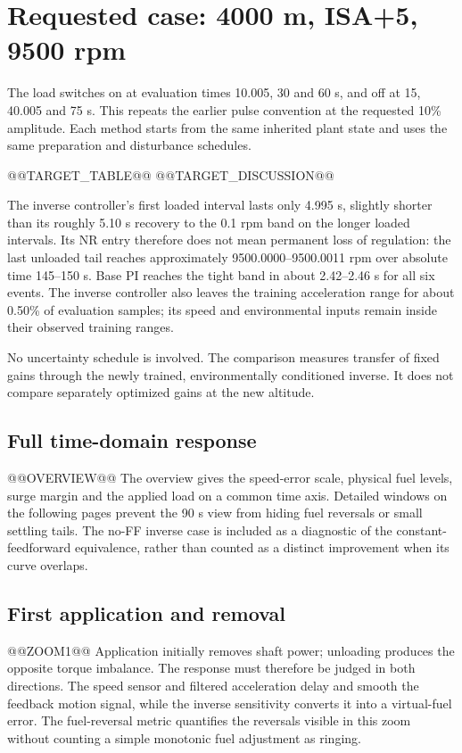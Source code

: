 \clearpage
\section{Requested case: 4000 m, ISA+5, 9500 rpm}
The load switches on at evaluation times 10.005, 30 and 60 s, and off at 15, 40.005 and 75 s. This repeats the earlier pulse convention at the requested 10\% amplitude. Each method starts from the same inherited plant state and uses the same preparation and disturbance schedules.

@@TARGET_TABLE@@
@@TARGET_DISCUSSION@@

The inverse controller's first loaded interval lasts only 4.995 s, slightly shorter than its roughly 5.10 s recovery to the 0.1 rpm band on the longer loaded intervals. Its NR entry therefore does not mean permanent loss of regulation: the last unloaded tail reaches approximately 9500.0000--9500.0011 rpm over absolute time 145--150 s. Base PI reaches the tight band in about 2.42--2.46 s for all six events. The inverse controller also leaves the training acceleration range for about 0.50\% of evaluation samples; its speed and environmental inputs remain inside their observed training ranges.

No uncertainty schedule is involved. The comparison measures transfer of fixed gains through the newly trained, environmentally conditioned inverse. It does not compare separately optimized gains at the new altitude.

\clearpage
\subsection{Full time-domain response}
@@OVERVIEW@@
The overview gives the speed-error scale, physical fuel levels, surge margin and the applied load on a common time axis. Detailed windows on the following pages prevent the 90 s view from hiding fuel reversals or small settling tails. The no-FF inverse case is included as a diagnostic of the constant-feedforward equivalence, rather than counted as a distinct improvement when its curve overlaps.

\clearpage
\subsection{First application and removal}
@@ZOOM1@@
Application initially removes shaft power; unloading produces the opposite torque imbalance. The response must therefore be judged in both directions. The speed sensor and filtered acceleration delay and smooth the feedback motion signal, while the inverse sensitivity converts it into a virtual-fuel error. The fuel-reversal metric quantifies the reversals visible in this zoom without counting a simple monotonic fuel adjustment as ringing.

